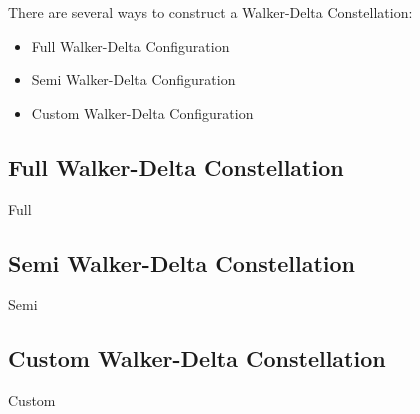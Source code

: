 
There are several ways to construct a Walker-Delta Constellation:

\begin{itemize}
\item Full Walker-Delta Configuration
\item Semi Walker-Delta Configuration
\item Custom Walker-Delta Configuration
\end{itemize}

\subsection{Full Walker-Delta Constellation}
{Full}

\subsection{Semi Walker-Delta Constellation}
{Semi}

\subsection{Custom Walker-Delta Constellation}
{Custom}


